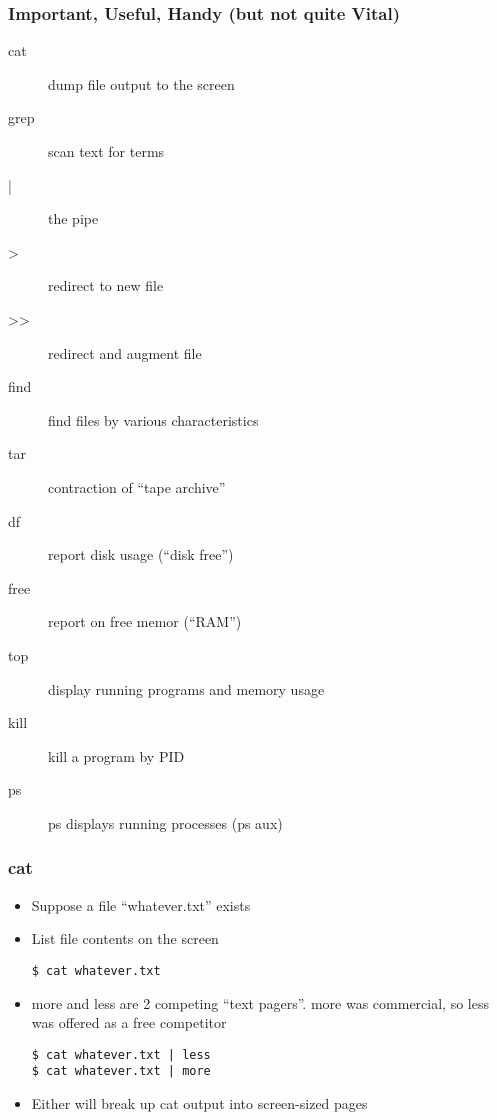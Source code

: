 \documentclass[English]{beamer}
\begin{document}
\begin{frame}
 \frametitle{Important, Useful, Handy (but not quite Vital)}

 \begin{description}
 \item[cat] dump file output to the screen
 \item[grep] scan text for terms
 \item[|] the pipe
 \item[>] redirect to new file
 \item[>>] redirect and augment file
 \item[find] find files by various characteristics
 \item[tar] contraction of ``tape archive''
 \item[df] report disk usage (``disk free'')
 \item[free] report on free memor (``RAM'')
 \item[top] display running programs and memory usage
 \item[kill] kill a program by PID
 \item[ps] ps displays running processes (ps aux)
 \end{description}
\end{frame}

\begin{frame}[containsverbatim]
  \frametitle{cat}
  \begin{itemize}
  \item Suppose a file ``whatever.txt'' exists
  \item List file contents on the screen
\begin{lstlisting}
$ cat whatever.txt
\end{lstlisting}
 
  \item more and less are 2 competing ``text pagers''. more was
    commercial, so less was offered as a free competitor  
\begin{lstlisting}
$ cat whatever.txt | less
$ cat whatever.txt | more
\end{lstlisting}

  \item Either will break up cat output into screen-sized pages

  \end{itemize}
\end{frame}
\end{document}
